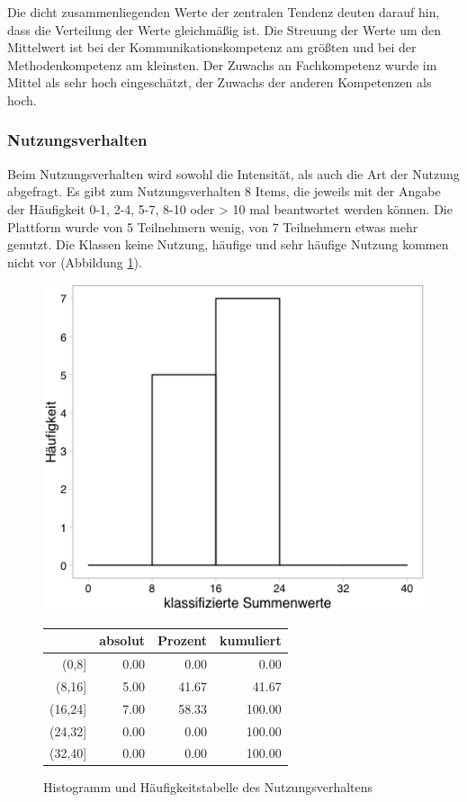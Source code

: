 \documentclass[12pt, bibliography=totoc]{scrartcl}
\begin{document}
Die dicht zusammenliegenden Werte der
zentralen Tendenz deuten darauf hin, dass die Verteilung der Werte
gleichmäßig ist. Die Streuung der Werte um den Mittelwert ist bei der
Kommunikationskompetenz am größten und bei der Methodenkompetenz am
kleinsten. Der Zuwachs an Fachkompetenz wurde im Mittel als sehr hoch
eingeschätzt, der Zuwachs der anderen Kompetenzen als hoch.

\subsubsection{Nutzungsverhalten}\label{nutzungsverhalten}

Beim Nutzungsverhalten wird sowohl die Intensität, als auch die Art der
Nutzung abgefragt. Es gibt zum Nutzungsverhalten 8 Items, die jeweils
mit der Angabe der Häufigkeit 0-1, 2-4, 5-7, 8-10 oder \textgreater{} 10
mal beantwortet werden können. Die Plattform wurde von 5 Teilnehmern
wenig, von 7 Teilnehmern etwas mehr genutzt. Die Klassen keine Nutzung,
häufige und sehr häufige Nutzung kommen nicht vor (Abbildung
\ref{fig:NV}).

\begin{figure}[H]
\begin{minipage}{.4\linewidth}
\includegraphics[width=0.8\linewidth]{Anhang/NVHistnn.png}

\label{pic:aufbau}
\end{minipage}
\begin{minipage}{.4\linewidth}
\centering
\raisebox{\depth}
{\begin{tabular}{rrrr}
  \hline
 & absolut & Prozent & kumuliert \\ 
  \hline
(0,8] & 0.00 & 0.00 & 0.00 \\ 
  (8,16] & 5.00 & 41.67 & 41.67 \\ 
  (16,24] & 7.00 & 58.33 & 100.00 \\ 
  (24,32] & 0.00 & 0.00 & 100.00 \\ 
  (32,40] & 0.00 & 0.00 & 100.00 \\ 
   \hline
\end{tabular}

}
\label{tab:defis}
\end{minipage}
\caption{Histogramm und Häufigkeitstabelle des Nutzungsverhaltens}
\label{fig:NV}
\end{figure}
\end{document}
